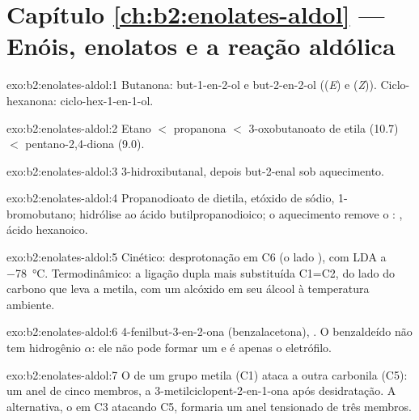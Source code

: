 \section*{Capítulo \ref{ch:b2:enolates-aldol} --- Enóis, enolatos e a reação aldólica}

\begin{solution}{exo:b2:enolates-aldol:1}
Butanona: but-1-en-2-ol  e but-2-en-2-ol  ((\textit{E}) e
(\textit{Z})). Ciclo-hexanona: ciclo-hex-1-en-1-ol.
\end{solution}

\begin{solution}{exo:b2:enolates-aldol:2}
Etano $<$ propanona $<$ 3-oxobutanoato de etila (10.7) $<$ pentano-2,4-diona (9.0).
\end{solution}

\begin{solution}{exo:b2:enolates-aldol:3}
3-hidroxibutanal, depois but-2-enal sob aquecimento.
\end{solution}

\begin{solution}{exo:b2:enolates-aldol:4}
Propanodioato de dietila, etóxido de sódio, 1-bromobutano; hidrólise ao ácido butilpropanodioico;
o aquecimento remove o : , ácido hexanoico.
\end{solution}

\begin{solution}{exo:b2:enolates-aldol:5}
Cinético: desprotonação em C6 (o lado ), com LDA a \qty{-78}{\degreeCelsius}. Termodinâmico:
a ligação dupla mais substituída C1=C2, do lado do carbono que leva a metila, com um alcóxido em seu
álcool à temperatura ambiente.
\end{solution}

\begin{solution}{exo:b2:enolates-aldol:6}
4-fenilbut-3-en-2-ona (benzalacetona), . O benzaldeído não tem hidrogênio $\alpha$:
ele não pode formar um  e é apenas o eletrófilo.
\end{solution}

\begin{solution}{exo:b2:enolates-aldol:7}
O  de um grupo metila (C1) ataca a outra carbonila (C5): um anel de cinco membros, a
3-metilciclopent-2-en-1-ona após desidratação. A alternativa, o  em C3 atacando C5,
formaria um anel tensionado de três membros.
\end{solution}

